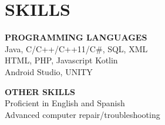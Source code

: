 \documentclass[10.99pt]{article}
\begin{document}
\vspace{-2em}
\section*{SKILLS}
\noindent\makebox[\linewidth]{\rule{7.2in}{0.4pt}} 
\vspace{-2.5em}
\begin{multicols}{2}
\noindent\textbf{PROGRAMMING LANGUAGES}
\\Java, C/C++/C++11/C\#, SQL, XML
\\HTML, PHP, Javascript Kotlin
\\Android Studio, UNITY
\\
\begin{minipage}[t]{0.5\textwidth}
\raggedright\textbf{OTHER SKILLS}
\\Proficient in English and Spanish
\\Advanced computer repair/troubleshooting
\end{minipage}
\columnbreak
\end{multicols}
\end{document}
